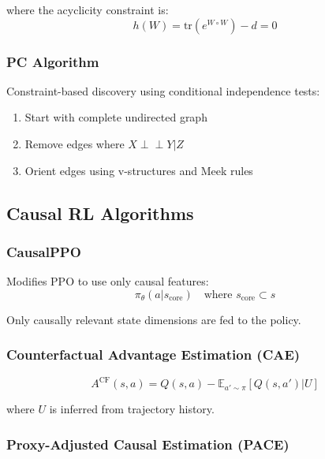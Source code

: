 \documentclass[11pt,a4paper]{article}
\newcommand{\E}{\mathbb{E}}
\begin{document}
where the acyclicity constraint is:
\begin{equation}
  h(W) = \text{tr}(e^{W \circ W}) - d = 0
\end{equation}

\subsubsection{PC Algorithm}

Constraint-based discovery using conditional independence tests:
\begin{enumerate}
  \item Start with complete undirected graph
  \item Remove edges where $X \perp\!\!\!\perp Y | Z$
  \item Orient edges using v-structures and Meek rules
\end{enumerate}

\subsection{Causal RL Algorithms}

\subsubsection{CausalPPO}

Modifies PPO to use only causal features:
\begin{equation}
  \pi_\theta(a|s_{\text{core}}) \quad \text{where } s_{\text{core}} \subset s
\end{equation}

Only causally relevant state dimensions are fed to the policy.

\subsubsection{Counterfactual Advantage Estimation (CAE)}

\begin{equation}
  A^{\text{CF}}(s, a) = Q(s, a) - \E_{a' \sim \pi}[Q(s, a')|U]
\end{equation}

where $U$ is inferred from trajectory history.

\subsubsection{Proxy-Adjusted Causal Estimation (PACE)}
\end{document}
